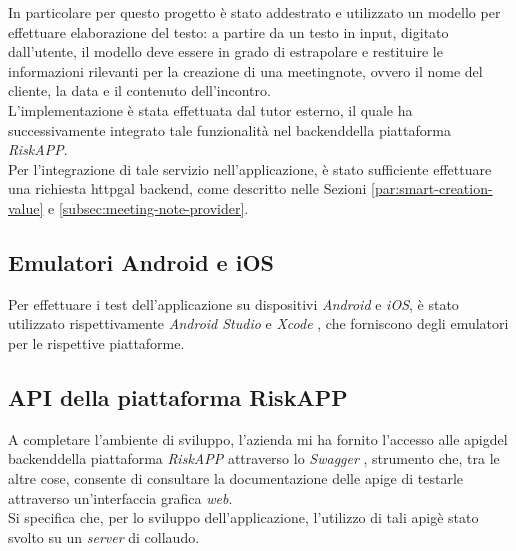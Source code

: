 \noindent In particolare per questo progetto è stato addestrato e utilizzato un modello per effettuare elaborazione del testo: a partire da un testo in input, digitato dall'utente, il modello deve essere in grado di estrapolare e restituire le informazioni rilevanti per la creazione di una \gls{meetingnote}\glsoccur, ovvero il nome del cliente, la data e il contenuto dell'incontro.\\
L'implementazione è stata effettuata dal tutor esterno, il quale ha successivamente integrato tale funzionalità nel \gls{backend}\glsoccur della piattaforma \emph{RiskAPP}.\\
Per l'integrazione di tale servizio nell'applicazione, è stato sufficiente effettuare una richiesta \gls{httpg}\glsoccur al \gls{backend}\glsoccur, come descritto nelle Sezioni \ref{par:smart-creation-value} e \ref{subsec:meeting-note-provider}.

\subsection*{Emulatori Android e iOS}
\label{subsec:emulatori}

Per effettuare i test dell'applicazione su dispositivi \emph{Android} e \emph{iOS}, è stato utilizzato rispettivamente \emph{Android Studio} \cite{site:android-studio} e \emph{Xcode} \cite{site:xcode}, che forniscono degli emulatori per le rispettive piattaforme.\\

\subsection*{API della piattaforma RiskAPP}
A completare l'ambiente di sviluppo, l'azienda mi ha fornito l'accesso alle \gls{apig}\glsoccur del \gls{backend}\glsoccur della piattaforma \emph{RiskAPP} attraverso lo \emph{Swagger} \cite{site:swagger}, strumento che, tra le altre cose, consente di consultare la documentazione delle \gls{apig}\glsoccur e di testarle attraverso un'interfaccia grafica \emph{web}.\\
Si specifica che, per lo sviluppo dell'applicazione, l'utilizzo di tali \gls{apig}\glsoccur è stato svolto su un \emph{server} di collaudo.